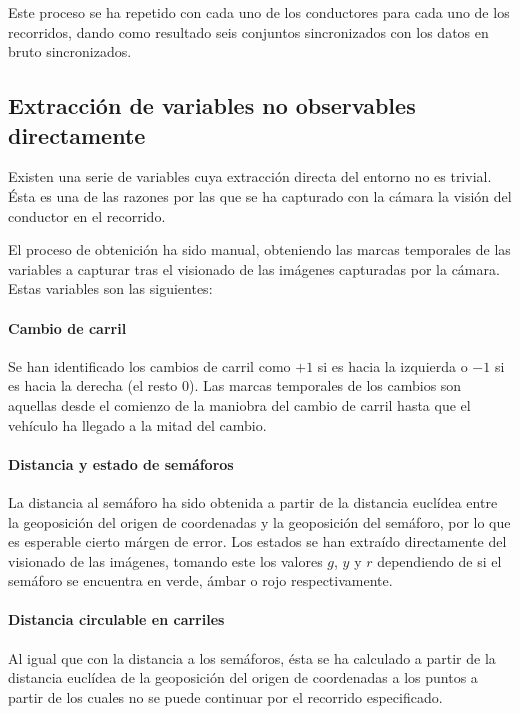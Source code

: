 Este proceso se ha repetido con cada uno de los conductores para cada uno de los recorridos, dando como resultado seis conjuntos sincronizados con los datos en bruto sincronizados.

\subsection{Extracción de variables no observables directamente}

Existen una serie de variables cuya extracción directa del entorno no es trivial. Ésta es una de las razones por las que se ha capturado con la cámara la visión del conductor en el recorrido.

El proceso de obtenición ha sido manual, obteniendo las marcas temporales de las variables a capturar tras el visionado de las imágenes capturadas por la cámara. Estas variables son las siguientes:

\paragraph{Cambio de carril}

Se han identificado los cambios de carril como $+1$ si es hacia la izquierda o $-1$ si es hacia la derecha (el resto $0$). Las marcas temporales de los cambios son aquellas desde el comienzo de la maniobra del cambio de carril hasta que el vehículo ha llegado a la mitad del cambio.

\paragraph{Distancia y estado de semáforos}

La distancia al semáforo ha sido obtenida a partir de la distancia euclídea entre la geoposición del origen de coordenadas y la geoposición del semáforo, por lo que es esperable cierto márgen de error. Los estados se han extraído directamente del visionado de las imágenes, tomando este los valores $g$, $y$ y $r$ dependiendo de si el semáforo se encuentra en verde, ámbar o rojo respectivamente.

\paragraph{Distancia circulable en carriles}

Al igual que con la distancia a los semáforos, ésta se ha calculado a partir de la distancia euclídea de la geoposición del origen de coordenadas a los puntos a partir de los cuales no se puede continuar por el recorrido especificado.


